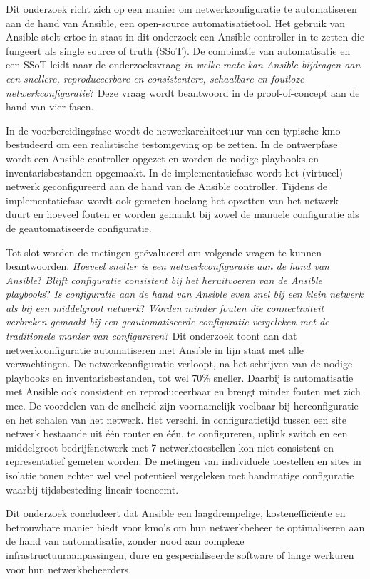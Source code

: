 Dit onderzoek richt zich op een manier om netwerkconfiguratie te automatiseren aan de hand van Ansible, een open-source automatisatietool. Het gebruik van Ansible stelt ertoe in staat in dit onderzoek een Ansible controller in te zetten die fungeert als single source of truth (SSoT). 
De combinatie van automatisatie en een SSoT leidt naar de onderzoeksvraag \textit{in welke mate kan Ansible bijdragen aan een snellere, reproduceerbare en consistentere, schaalbare en foutloze netwerkconfiguratie}?
Deze vraag wordt beantwoord in de proof-of-concept aan de hand van vier fasen. 
\vspace{1em}

In de voorbereidingsfase wordt de netwerkarchitectuur van een typische kmo bestudeerd om een realistische testomgeving op te zetten.
In de ontwerpfase wordt een Ansible controller opgezet en worden de nodige playbooks en inventarisbestanden opgemaakt. In de implementatiefase wordt het (virtueel) netwerk geconfigureerd aan de hand van de Ansible controller. Tijdens de implementatiefase wordt ook gemeten hoelang het opzetten van het netwerk duurt en hoeveel fouten er worden gemaakt bij zowel de manuele configuratie als de geautomatiseerde configuratie.
\vspace{1em}

Tot slot worden de metingen geëvalueerd om volgende vragen te kunnen beantwoorden. \textit{Hoeveel sneller is een netwerkconfiguratie aan de hand van Ansible}? 
\textit{Blijft configuratie consistent bij het heruitvoeren van de Ansible playbooks}? \textit{Is configuratie aan de hand van Ansible even snel bij een klein netwerk als bij een middelgroot netwerk}?
\textit{Worden minder fouten die connectiviteit verbreken gemaakt bij een geautomatiseerde configuratie vergeleken met de traditionele manier van configureren}?
Dit onderzoek toont aan dat netwerkconfiguratie automatiseren met Ansible in lijn staat met alle verwachtingen. 
De netwerkconfiguratie verloopt, na het schrijven van de nodige playbooks en inventarisbestanden, tot wel 70\% sneller. Daarbij is automatisatie met Ansible ook consistent en reproduceerbaar en brengt minder fouten met zich mee. De voordelen van de snelheid zijn voornamelijk voelbaar bij herconfiguratie en het schalen van het netwerk. 
Het verschil in configuratietijd tussen een site netwerk bestaande uit één router en één, te configureren, uplink switch en een middelgroot bedrijfsnetwerk met 7 netwerktoestellen kon niet consistent en representatief gemeten worden.
De metingen van individuele toestellen en sites in isolatie tonen echter wel veel potentieel vergeleken met handmatige configuratie waarbij tijdsbesteding lineair toeneemt.
\vspace{1em}

Dit onderzoek concludeert dat Ansible een laagdrempelige, kostenefficiënte en betrouwbare manier biedt voor kmo's om hun netwerkbeheer te optimaliseren aan de hand van automatisatie, zonder nood aan complexe infrastructuuraanpassingen, dure en gespecialiseerde software of lange werkuren voor hun netwerkbeheerders.
